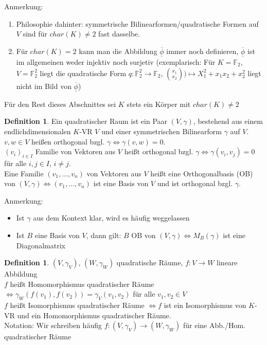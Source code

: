 \documentclass[10pt,a4paper,numbers=endperiod]{scrartcl}
\theoremstyle{definition}
\newtheorem{defi}[satz]{Definition}
\def\FF{{\mathbb F}}
\begin{document}
Anmerkung: 

\begin{enumerate}
	\item Philosophie dahinter: symmetrische Bilinearformen/quadratische Formen auf $V$ sind für $char(K) \neq 2$ fast dasselbe.
	\item Für $char(K)  = 2$ kann man die Abbildung $\overline{\underline{\phi}}$ immer noch definieren, $\overline{\underline{\phi}}$ ist im allgemeinen weder injektiv noch surjetiv (exemplarisch: Für $K = \FF_2$, $V = \FF_2^2$ liegt die quadratische Form $q: \FF_2^2 \rightarrow \FF_2$, $\binom{x_1}{x_2}) \mapsto X_1^2+ x_1x_2 + x_2^2$ liegt nicht im Bild von $\overline{\underline{\phi}}$) 
\end{enumerate}

Für den Rest dieses Abschnittes sei $K$  stets  ein Körper mit $char(K) \neq 2$

\begin{defi}
	Ein quadratischer Raum ist ein Paar $(V, \gamma)$, bestehend aus einem endlichdimensionalen $K$-VR $V$ und einer symmetrischen Bilinearform $\gamma$ auf $V$.\\
	$v,w \in V$ heißen orthogonal bzgl. $\gamma \Leftrightarrow \gamma (v,w) = 0$.\\
	$(v_i)_{i \in I}$ Familie von Vektoren aus $V$ heißt orthogonal bzgl. $\gamma \Leftrightarrow \gamma(v_i, v_j) = 0$ für alle $i,j \in I$, $i \neq j$.\\
	Eine Familie $(v_1, \ldots, v_n)$ von Vektoren aus $V$ heißt eine Orthogonalbasis (OB) von $(V,\gamma) \Leftrightarrow (v_1, \ldots, v_n)$ ist eine Basis von $V$ und ist orthogonal bzgl. $\gamma$.
\end{defi}

Anmerkung: 
\begin{itemize}
	\item Ist $\gamma$ aus dem Kontext klar, wird es häufig weggelassen
	\item Ist $B$ eine Basis von $V$, dann gilt: $B$ OB von $(V, \gamma) \Leftrightarrow M_B(\gamma)$ ist eine Diagonalmatrix
\end{itemize}

\begin{defi}
	$(V, \gamma_V)$, $(W, \gamma_W)$ quadratische Räume, $f: V \rightarrow W$ lineare Abbildung\\
	$f$ heißt Homomorphismus quadratischer Räume $\Leftrightarrow \gamma_W (f(v_1), f(v_2)) = \gamma_V(v_1, v_2)$ für alle $v_1,v_2 \in V$\\
	$f$ heißt Isomorphismus quadratischer Räume $\Leftrightarrow f$ ist ein Isomorphismus von $K$-VR und ein Homomorphismus quadratischer Räume.\\ 
	Notation: Wir schreiben häufig $f:  (V, \gamma_V) \rightarrow (W, \gamma_W)$ für eine Abb./Hom. quadratischer Räume
\end{defi}
\end{document}
